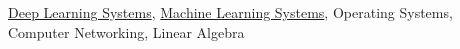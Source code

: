 {\href{https://dlsyscourse.org}{Deep Learning Systems}, \href{https://ucbsky.github.io/aisys-fa2024/}{Machine Learning Systems}, Operating Systems, Computer Networking, Linear Algebra}
